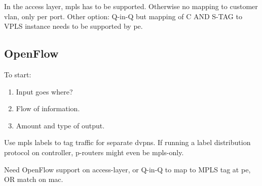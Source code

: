 In the access layer, \ac{mpls} has to be supported. Otherwise no mapping to customer \ac{vlan}, only per port. Other option: Q-in-Q but mapping of C AND S-TAG to VPLS instance needs to be supported by \ac{pe}.


\subsection{OpenFlow} %
\label{sub:openflow}
To start:
\begin{enumerate}
	\item Input goes where?
	\item Flow of information.
	\item Amount and type of output.
\end{enumerate}

Use \ac{mpls} labels to tag traffic for separate \acp{dvpn}. If running a label distribution protocol on controller, \ac{p}-routers might even be \ac{mpls}-only.

Need OpenFlow support on access-layer, or Q-in-Q to map to MPLS tag at \ac{pe}, OR match on \ac{mac}.






